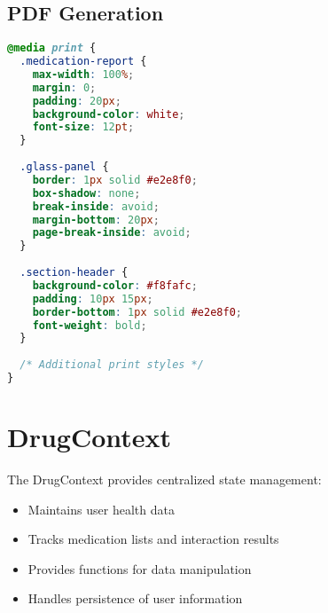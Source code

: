 \documentclass[12pt,a4paper]{report}
\begin{document}
\subsection{PDF Generation}
\begin{lstlisting}[language=CSS, caption=PDF Styling for Reports]
@media print {
  .medication-report {
    max-width: 100%;
    margin: 0;
    padding: 20px;
    background-color: white;
    font-size: 12pt;
  }
  
  .glass-panel {
    border: 1px solid #e2e8f0;
    box-shadow: none;
    break-inside: avoid;
    margin-bottom: 20px;
    page-break-inside: avoid;
  }
  
  .section-header {
    background-color: #f8fafc;
    padding: 10px 15px;
    border-bottom: 1px solid #e2e8f0;
    font-weight: bold;
  }
  
  /* Additional print styles */
}
\end{lstlisting}

\section{DrugContext}
The DrugContext provides centralized state management:
\begin{itemize}
    \item Maintains user health data
    \item Tracks medication lists and interaction results
    \item Provides functions for data manipulation
    \item Handles persistence of user information
\end{itemize}
\end{document}
